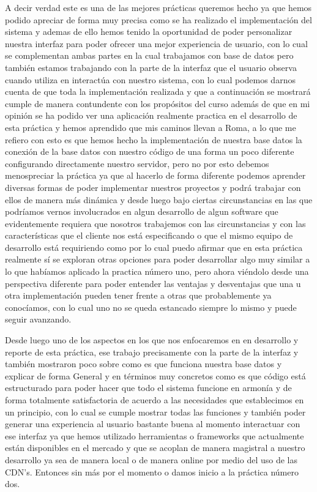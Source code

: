 \documentclass[10pt,a4paper]{article}
\begin{document}
\vspace{5mm}

A decir verdad este es una de las mejores prácticas queremos hecho ya que hemos podido apreciar de forma muy precisa como se ha realizado el implementación del sistema y ademas de ello hemos tenido la oportunidad de poder personalizar nuestra interfaz para poder ofrecer una mejor experiencia de usuario, con lo cual se complementan ambas partes en la cual trabajamos con base de datos pero también estamos trabajando con la parte de la interfaz que el usuario observa cuando utiliza en interactúa con nuestro sistema, con lo cual podemos darnos cuenta de que toda la implementación realizada y que a continuación se mostrará cumple de manera contundente con los propósitos del curso además de que en mi opinión se ha podido ver una aplicación realmente practica en el desarrollo de esta práctica y hemos aprendido que mis caminos llevan a Roma, a lo que me refiero con esto es que hemos hecho la implementación de nuestra base datos la conexión de la base datos con nuestro código de una forma un poco diferente configurando directamente nuestro servidor, pero no por esto debemos menospreciar la práctica ya que al hacerlo de forma diferente podemos aprender diversas formas de poder implementar nuestros proyectos y podrá trabajar con ellos de manera más dinámica y desde luego bajo ciertas circunstancias en las que podríamos vernos involucrados en algun desarrollo de algun software que evidentemente requiera que nosotros trabajemos con las circunstancias y con las características que el cliente nos está especificando o que el mismo equipo de desarrollo está requiriendo como por lo cual puedo afirmar que en esta práctica realmente sí se exploran otras opciones para poder desarrollar algo muy similar a lo que habíamos aplicado la practica número uno, pero ahora viéndolo desde una perspectiva diferente para poder entender las ventajas y desventajas que una u otra implementación pueden tener frente a otras que probablemente ya conocíamos, con lo cual uno no se queda estancado siempre lo mismo y puede seguir avanzando.

\vspace{5mm}

Desde luego uno de los aspectos en los que nos enfocaremos en en desarrollo y reporte de esta práctica, ese trabajo precisamente con la parte de la interfaz y también mostraron poco sobre como es que funciona nuestra base datos y explicar de forma General y en términos muy concretos como es que código está estructurado para poder hacer que todo el sistema funcione en armonía y de forma totalmente satisfactoria de acuerdo a las necesidades que establecimos en un principio, con lo cual se cumple mostrar todas las funciones y también poder generar una experiencia al usuario bastante buena al momento interactuar con ese interfaz ya que hemos utilizado herramientas o frameworks que actualmente están disponibles en el mercado y que se acoplan de manera magistral a nuestro desarrollo ya sea de manera local o de manera online por medio del uso de las CDN’s. Entonces sin más por el momento o damos inicio a la práctica número dos.
\end{document}
